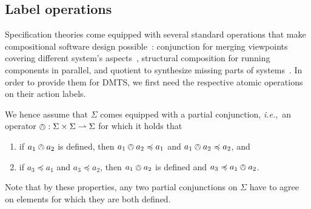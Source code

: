 \documentclass[twocolumn]{svjour3-dummy}
\newcommand*\labpre{\preccurlyeq}
\newcommand*\ie{\textit{i.e.},}
\newcommand*\oland{\owedge}
\newcommand*\parto{\rightharpoonup}
\begin{document}
\subsection{Label operations}

Specification theories come equipped with several standard operations
that make compositional software design
possible~\cite{DBLP:conf/fase/BauerDHLLNW12}: conjunction for merging
viewpoints covering different system's
aspects~\cite{DBLP:conf/sigsoft/UchitelC04,
  DBLP:conf/concur/Ben-DavidCU13}, structural composition for running
components in parallel, and quotient to synthesize missing parts of
systems~\cite{DBLP:conf/lics/LarsenX90}. In order to provide them
for DMTS, we first need the respective atomic operations on their action
labels.

We hence assume that $\Sigma$ comes equipped with a partial conjunction,
\ie~an operator $\oland: \Sigma\times \Sigma\parto \Sigma$ for which it
holds that
\begin{enumerate}[(1)]
\item \label{en:oland.lb} if $a_1\oland a_2$ is defined, then $a_1\oland
  a_2\labpre a_1$ and $a_1\oland a_2\labpre a_2$, and
\item \label{en:oland.glb} if $a_3\labpre a_1$ and $a_3\labpre a_2$, then
  $a_1\oland a_2$ is defined and $a_3\labpre a_1\oland a_2$.
\end{enumerate}
Note that by these properties, any two partial conjunctions on $\Sigma$
have to agree on elements for which they are both defined.
\end{document}
